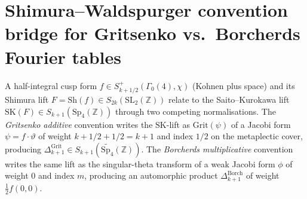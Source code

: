 \section{Shimura--Waldspurger convention bridge for Gritsenko vs.\
Borcherds Fourier tables}
\label{sec:concord-shimura-waldspurger-bridge}

A half-integral cusp form
$f \in S_{k+1/2}^+(\Gamma_0(4), \chi)$ (Kohnen plus space) and its
Shimura lift
$F = \mathrm{Sh}(f) \in S_{2k}(\mathrm{SL}_2(\mathbb Z))$
relate to the Saito--Kurokawa lift
$\mathrm{SK}(F) \in S_{k+1}(\mathrm{Sp}_4(\mathbb Z))$ through two
competing normalisations. The \emph{Gritsenko additive} convention
\cite{Gritsenko1999} writes the $\mathrm{SK}$-lift as
$\mathrm{Grit}(\psi)$ of a Jacobi form
$\psi = f \cdot \vartheta$ of weight $k+1/2 + 1/2 = k+1$ and index
$1/2$ on the metaplectic cover, producing
$\Delta_{k+1}^{\mathrm{Grit}} \in
S_{k+1}(\widetilde{\mathrm{Sp}_4}(\mathbb Z))$. The
\emph{Borcherds multiplicative} convention
\cite{Borcherds1998} writes the same lift as the singular-theta
transform of a weak Jacobi form $\phi$ of weight $0$ and index $m$,
producing an automorphic product
$\Delta_{k+1}^{\mathrm{Borch}}$ of weight
$\tfrac{1}{2} f(0, 0)$.

